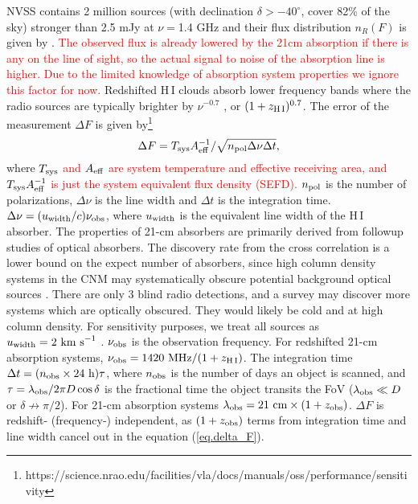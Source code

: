 \documentclass[]{raa}
\newcommand{\HI}{{H{\small\,I}}}
\newcommand{\tcr}{\textcolor{red}}
\begin{document}
NVSS contains 2 million sources (with declination $\delta >-40^\circ$,
cover 82\% of the sky) stronger than 2.5
mJy at $\nu=$1.4 GHz \citep{1998AJ....115.1693C} and their flux
distribution $n_R(F)$ is given by \cite{1984ApJ...287..461C}.
\tcr{The observed flux is already lowered by the 21cm absorption if there is any on
the line of sight, so the actual signal to noise of the absorption line
is higher. Due to the limited knowledge of absorption system properties
we ignore this factor for now.}
Redshifted {\HI} clouds absorb lower frequency bands where
the radio sources are typically brighter by $\nu^{-0.7}$
\citep{1998AJ....115.1693C}, or $(1+z_{\rm \HI})^{0.7}$.
The error of the measurement $\Delta F$ is given by\footnote{https://science.nrao.edu/facilities/vla/docs/manuals/oss/performance/sensitivity}
\begin{equation}\label{eq.delta_F}
    \Delta F=T_{\rm sys}A_{\rm eff}^{-1}/\sqrt{n_{\rm pol}\Delta\nu\Delta t},
\end{equation}
where
\tcr{$T_{\rm sys}$ and $A_{\rm eff}$ are system temperature and effective receiving area,
and $T_{\rm sys}A_{\rm eff}^{-1}$ is just the system equivalent flux density (SEFD).}
$n_{\rm pol}$
is the number of polarizations, $\Delta\nu$ is the line width and
$\Delta t$ is the integration time. $\Delta\nu=(u_{\rm width}/c)\nu_{\rm obs}$,
where $u_{\rm width}$ is the equivalent line width of the {\HI}
absorber. The properties of 21-cm absorbers are primarily derived from
followup studies of optical absorbers. The discovery rate from the
cross correlation is a lower bound on the expect number of absorbers,
since high column density systems in the CNM may systematically
obscure potential background optical sources \citep{2014PhRvL.113d1303Y}. There are
only 3 blind radio detections, and a survey may discover more systems
which are optically obscured. They would likely be cold and at high
column density. For sensitivity purposes, we treat all sources as
$u_{\rm width}=2\ {\rm km\ s}^{-1}$
\citep{1982ApJ...259..495W,2005ARA&A..43..861W}.
$\nu_{\rm obs}$ is the observation frequency. For redshifted
21-cm absorption systems, $\nu_{\rm obs}=1420\ {\rm MHz}/(1+z_{\rm \HI})$.
The integration time $\Delta t=(n_{\rm obs}\times 24\ {\rm h})\tau$,
where $n_{\rm obs}$ is the number of days an object is scanned,
and $\tau=\lambda_{\rm obs}/2\pi D\cos\delta$ is the fractional time the object
transits the FoV ($\lambda_{\rm obs}\ll D$ or $\delta\nrightarrow\pi/2$).
For 21-cm absorption systems $\lambda_{\rm obs}=21\ {\rm cm}\times (1+z_{\rm obs})$.
$\Delta F$ is redshift- (frequency-) independent, as $(1+z_{\rm obs})$ terms
from integration time and line width cancel out
in the equation (\ref{eq.delta_F}).
\end{document}
